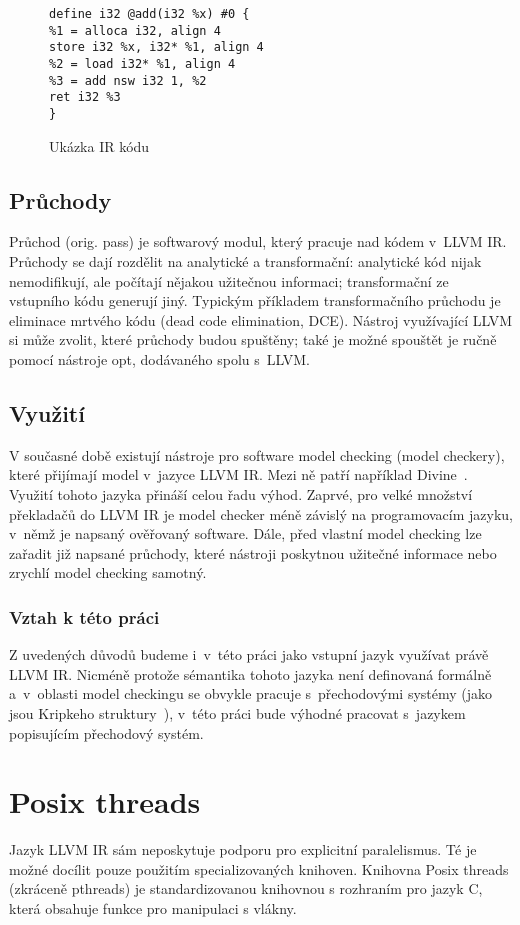 \documentclass{fithesis2}
\begin{document}
\begin{figure}[h!]
\begin{lstlisting}
define i32 @add(i32 %x) #0 {
%1 = alloca i32, align 4
store i32 %x, i32* %1, align 4
%2 = load i32* %1, align 4
%3 = add nsw i32 1, %2
ret i32 %3
}
\end{lstlisting}
\caption{Ukázka IR kódu}
\label{IR-EX}
\end{figure}

\subsection{Průchody}
Průchod (orig. pass) je softwarový modul, který pracuje nad kódem v~LLVM IR. Průchody se dají rozdělit na analytické a transformační: analytické kód nijak nemodifikují, ale počítají nějakou užitečnou informaci; transformační ze vstupního kódu generují jiný. Typickým příkladem transformačního průchodu je eliminace mrtvého kódu (dead code elimination, DCE). Nástroj využívající LLVM si může zvolit, které průchody budou spuštěny; také je možné spouštět je ručně pomocí nástroje opt, dodávaného spolu s~LLVM.

\subsection{Využití}
V současné době existují nástroje pro software model checking (model checkery), které přijímají model v~jazyce LLVM IR. Mezi ně patří například Divine~\cite{BBH+13}. Využití tohoto jazyka přináší celou řadu výhod. Zaprvé, pro velké množství překladačů do LLVM IR je model checker méně závislý na programovacím jazyku, v~němž je napsaný ověřovaný software. Dále, před vlastní model checking lze zařadit již napsané průchody, které nástroji poskytnou užitečné informace nebo zrychlí model checking samotný.

\subsubsection{Vztah k této práci}
Z uvedených důvodů budeme i~v~této práci jako vstupní jazyk využívat právě LLVM IR. Nicméně protože sémantika tohoto jazyka není definovaná formálně a~v~oblasti model checkingu se obvykle pracuje s~přechodovými systémy (jako jsou Kripkeho struktury~\cite{CLARKE}), v~této práci bude výhodné pracovat s~jazykem popisujícím přechodový systém.


\section{Posix threads}
\label{sec:posix-threads}
Jazyk LLVM IR sám neposkytuje podporu pro explicitní paralelismus. Té je možné docílit pouze použitím specializovaných knihoven. Knihovna Posix threads (zkráceně pthreads) je standardizovanou knihovnou s rozhraním pro jazyk C, která obsahuje funkce pro manipulaci s vlákny.
\end{document}
